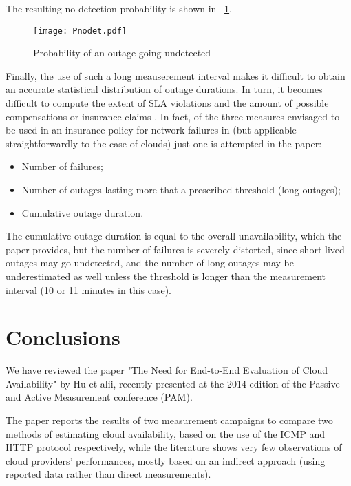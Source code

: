 \documentclass[runningheads,a4paper]{llncs}
\begin{document}
The resulting no-detection probability is shown in \figurename~\ref{fig:nodet}.





\begin{figure}
\begin{center}
\texttt{[image: Pnodet.pdf]}
\caption{Probability of an outage going undetected}
\label{fig:nodet} 
\end{center}
\end{figure}

Finally, the use of such a long meauserement interval makes it difficult to obtain an accurate  statistical distribution of outage durations. In turn, it becomes difficult to compute the extent of SLA violations and the amount of possible compensations or insurance claims \cite{Naldi-Fedcsis11}\cite{Naldi-ICQT11}\cite{CholdaFHKNN13}. In fact,  of the three measures envisaged to be used in an insurance policy for network failures in \cite{NaldiN11} (but applicable straightforwardly to the case of clouds) just one is attempted in the paper:
\begin{itemize}
\item Number of failures;
\item Number of outages lasting more that a prescribed threshold (long outages);
\item Cumulative outage duration.
\end{itemize}
The cumulative outage duration is equal to the overall unavailability, which the paper provides, but the number of failures is severely distorted, since short-lived outages may go undetected, and the number of long outages may be underestimated as well unless the threshold is longer than the measurement interval (10 or 11 minutes in this case). 

\section{Conclusions}
We have reviewed the paper "The Need for End-to-End Evaluation of Cloud Availability" by Hu et alii, recently presented at the 2014  edition of the Passive and Active Measurement conference (PAM).

The paper reports the results of two measurement campaigns to compare two methods of estimating cloud availability, based on the use of the ICMP and HTTP protocol respectively, while the literature shows very few observations of cloud providers' performances, mostly based on an indirect approach (using reported data rather than direct measurements).
\end{document}
